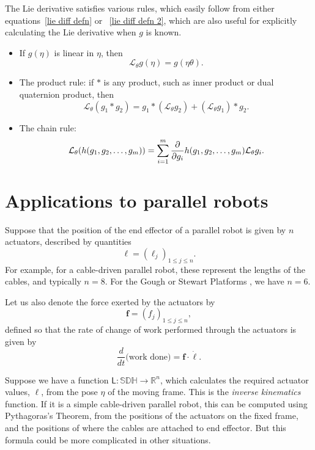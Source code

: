 \documentclass[reqno,12pt]{amsart}
\newcommand\setunitdualquat{\mathbb S\mathbb D\mathbb H}
\newcommand{\liederiv}{\mathcal L}
\begin{document}
The Lie derivative satisfies various rules, which easily follow from either equations~\eqref{lie diff defn} or ~\eqref{lie diff defn 2}, which are also useful for explicitly calculating the Lie derivative when $g$ is known.
\begin{itemize}
\item If $g(\eta)$ is linear in $\eta$, then
\begin{equation}
\label{rule linear}
\liederiv_\theta g(\eta) = g(\eta \theta).
\end{equation}
\item The product rule: if $*$ is any product, such as inner product or dual quaternion product, then
\begin{equation}
\liederiv_\theta (g_1 * g_2) = g_1 * (\liederiv_\theta g_2) + (\liederiv_\theta g_1) * g_2.
\end{equation}
\item The chain rule:
\begin{equation}
\liederiv_\theta (h(g_1, g_2,\dots,g_m)) \\ = \sum_{i=1}^m
\frac\partial{\partial g_i} h(g_1, g_2,\dots,g_m) \liederiv_\theta g_i .
\end{equation}
\end{itemize}

\section{Applications to parallel robots}

Suppose that the position of the end effector of a parallel robot is given by $n$ actuators, described by quantities
\begin{equation}
\bm \ell = (\ell_j)_{1 \le j \le n} .
\end{equation}
For example, for a cable-driven parallel robot, these represent the lengths of the cables, and typically $n = 8$.  For the Gough or Stewart Platforms \cite{gallardo-alvarado}, we have $n = 6$.

Let us also denote the force exerted by the actuators by 
\begin{equation}
\bm f = (f_j)_{1 \le j \le n} ,
\end{equation}
defined so that the rate of change of work performed through the actuators is given by
\begin{equation}
\label{dot h f ell}
\frac{d}{dt} \text{(work done)} = \bm f \cdot \dot{\bm\ell} .
\end{equation}

Suppose we have a function $\mathsf L : \setunitdualquat \to \mathbb R^n$, which calculates the required actuator values, $\bm \ell$, from the pose $\eta$ of the moving frame.  This is the \emph{inverse kinematics} function.  If it is a simple cable-driven parallel robot, this can be computed using Pythagoras's Theorem, from the positions of the actuators on the fixed frame, and the positions of where the cables are attached to end effector.  But this formula could be more complicated in other situations.
\end{document}
